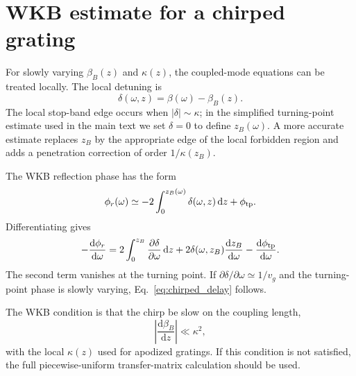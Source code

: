 \documentclass[aps,pra,twocolumn,superscriptaddress,nofootinbib]{revtex4-2}
\newcommand{\dd}{\mathrm{d}}
\begin{document}
\section{WKB estimate for a chirped grating}
\label{app:wkb}

For slowly varying $\beta_B(z)$ and $\kappa(z)$, the coupled-mode equations can be treated locally.  The local detuning is
\begin{equation}
    \delta(\omega,z)=\beta(\omega)-\beta_B(z).
\end{equation}
The local stop-band edge occurs when $|\delta|\sim\kappa$; in the simplified turning-point estimate used in the main text we set $\delta=0$ to define $z_B(\omega)$.  A more accurate estimate replaces $z_B$ by the appropriate edge of the local forbidden region and adds a penetration correction of order $1/\kappa(z_B)$.

The WKB reflection phase has the form
\begin{equation}
    \phi_r(\omega)\simeq -2\int_0^{z_B(\omega)}\delta(\omega,z)\,\dd z+\phi_{\rm tp}.
\end{equation}
Differentiating gives
\begin{equation}
    -\frac{\dd\phi_r}{\dd\omega}
    =2\int_0^{z_B}\frac{\partial\delta}{\partial\omega}\,\dd z
    +2\delta(\omega,z_B)\frac{\dd z_B}{\dd\omega}
    -\frac{\dd\phi_{\rm tp}}{\dd\omega}.
\end{equation}
The second term vanishes at the turning point.  If $\partial\delta/\partial\omega\simeq1/v_g$ and the turning-point phase is slowly varying, Eq.~\eqref{eq:chirped_delay} follows.

The WKB condition is that the chirp be slow on the coupling length,
\begin{equation}
    \left|\frac{\dd\beta_B}{\dd z}\right|\ll \kappa^2,
\end{equation}
with the local $\kappa(z)$ used for apodized gratings.  If this condition is not satisfied, the full piecewise-uniform transfer-matrix calculation should be used.


\end{document}
